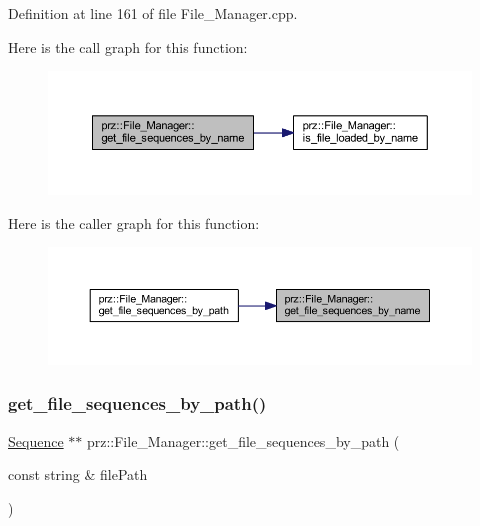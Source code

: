 Definition at line 161 of file File\+\_\+\+Manager.\+cpp.

Here is the call graph for this function\+:
\nopagebreak
\begin{figure}[H]
\begin{center}
\leavevmode
\includegraphics[width=350pt]{classprz_1_1_file___manager_a9e617521f5fa135f8ecb4b967eed4b7c_cgraph}
\end{center}
\end{figure}
Here is the caller graph for this function\+:
\nopagebreak
\begin{figure}[H]
\begin{center}
\leavevmode
\includegraphics[width=350pt]{classprz_1_1_file___manager_a9e617521f5fa135f8ecb4b967eed4b7c_icgraph}
\end{center}
\end{figure}
\mbox{\label{classprz_1_1_file___manager_a75c22ac120dc18a061d5c2c68f965d0b}} 
\subsubsection{\texorpdfstring{get\_file\_sequences\_by\_path()}{get\_file\_sequences\_by\_path()}}
{\footnotesize\ttfamily \mbox{\hyperlink{classprz_1_1_sequence}{Sequence}} $\ast$$\ast$ prz\+::\+File\+\_\+\+Manager\+::get\+\_\+file\+\_\+sequences\+\_\+by\+\_\+path (\begin{DoxyParamCaption}\item[{const string \&}]{file\+Path }\end{DoxyParamCaption})}




